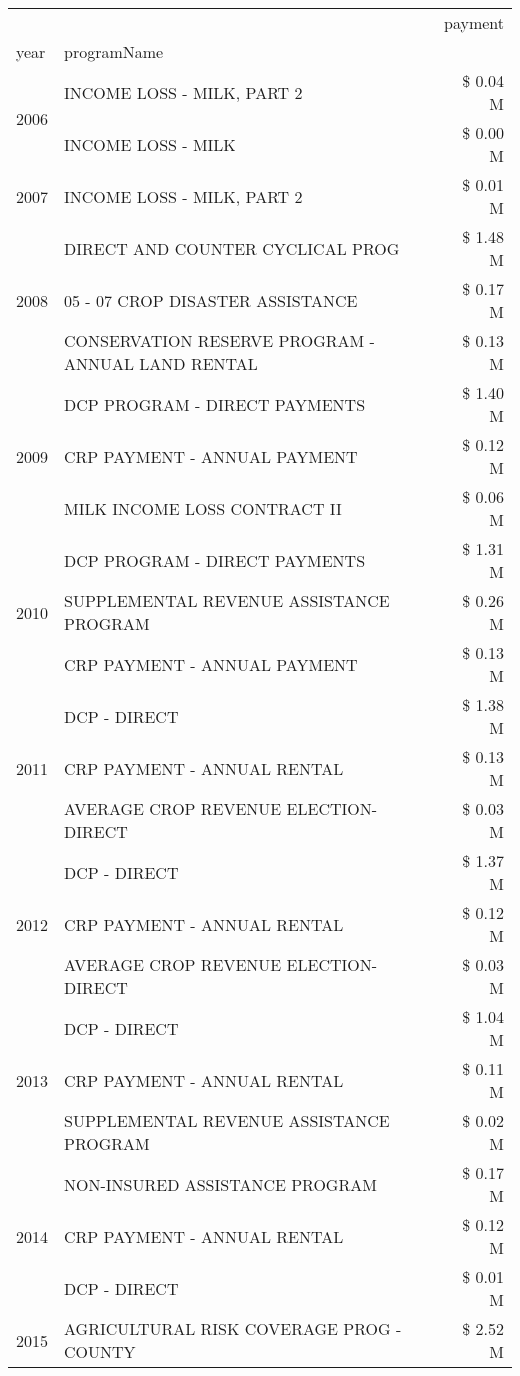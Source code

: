 \begin{tabular}{llr}
\toprule
 &  & payment \\
year & programName &  \\
\midrule
\multirow[t]{2}{*}{2006} & INCOME LOSS - MILK, PART 2 & \$ 0.04 M \\
 & INCOME LOSS - MILK & \$ 0.00 M \\
\cline{1-3}
2007 & INCOME LOSS - MILK, PART 2 & \$ 0.01 M \\
\cline{1-3}
\multirow[t]{3}{*}{2008} & DIRECT AND COUNTER CYCLICAL PROG & \$ 1.48 M \\
 & 05 - 07 CROP DISASTER ASSISTANCE & \$ 0.17 M \\
 & CONSERVATION RESERVE PROGRAM - ANNUAL LAND RENTAL & \$ 0.13 M \\
\cline{1-3}
\multirow[t]{3}{*}{2009} & DCP PROGRAM - DIRECT PAYMENTS & \$ 1.40 M \\
 & CRP PAYMENT - ANNUAL PAYMENT & \$ 0.12 M \\
 & MILK INCOME LOSS CONTRACT II & \$ 0.06 M \\
\cline{1-3}
\multirow[t]{3}{*}{2010} & DCP PROGRAM - DIRECT PAYMENTS & \$ 1.31 M \\
 & SUPPLEMENTAL REVENUE ASSISTANCE PROGRAM & \$ 0.26 M \\
 & CRP PAYMENT - ANNUAL PAYMENT & \$ 0.13 M \\
\cline{1-3}
\multirow[t]{3}{*}{2011} & DCP - DIRECT & \$ 1.38 M \\
 & CRP PAYMENT - ANNUAL RENTAL & \$ 0.13 M \\
 & AVERAGE CROP REVENUE ELECTION-DIRECT & \$ 0.03 M \\
\cline{1-3}
\multirow[t]{3}{*}{2012} & DCP - DIRECT & \$ 1.37 M \\
 & CRP PAYMENT - ANNUAL RENTAL & \$ 0.12 M \\
 & AVERAGE CROP REVENUE ELECTION-DIRECT & \$ 0.03 M \\
\cline{1-3}
\multirow[t]{3}{*}{2013} & DCP - DIRECT & \$ 1.04 M \\
 & CRP PAYMENT - ANNUAL RENTAL & \$ 0.11 M \\
 & SUPPLEMENTAL REVENUE ASSISTANCE PROGRAM & \$ 0.02 M \\
\cline{1-3}
\multirow[t]{3}{*}{2014} & NON-INSURED ASSISTANCE PROGRAM & \$ 0.17 M \\
 & CRP PAYMENT - ANNUAL RENTAL & \$ 0.12 M \\
 & DCP - DIRECT & \$ 0.01 M \\
\cline{1-3}
\multirow[t]{3}{*}{2015} & AGRICULTURAL RISK COVERAGE PROG - COUNTY & \$ 2.52 M \\

\end{tabular}
